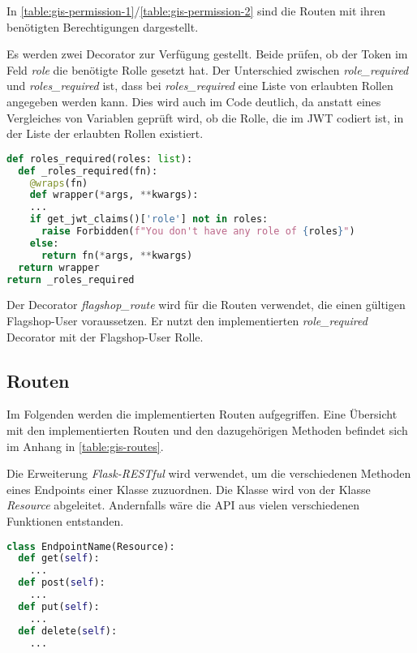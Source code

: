 In \autoref{table:gis-permission-1}/\ref{table:gis-permission-2} sind die Routen mit ihren benötigten Berechtigungen dargestellt.

Es werden zwei Decorator zur Verfügung gestellt. Beide prüfen, ob der Token im Feld \textit{role} die benötigte Rolle gesetzt hat. Der Unterschied zwischen \textit{role\_required} und \textit{roles\_required} ist, dass bei \textit{roles\_required} eine Liste von erlaubten Rollen angegeben werden kann. Dies wird auch im Code deutlich, da anstatt eines Vergleiches von Variablen geprüft wird, ob die Rolle, die im JWT codiert ist, in der Liste der erlaubten Rollen existiert.

\begin{lstlisting}[language=Python, frame=single, caption={GIS Prüfung der Rollen}, captionpos=b, label={lst:gis-permission-wrapper}]
def roles_required(roles: list):
  def _roles_required(fn):
    @wraps(fn)
    def wrapper(*args, **kwargs):
    ...
    if get_jwt_claims()['role'] not in roles:
      raise Forbidden(f"You don't have any role of {roles}")
    else:
      return fn(*args, **kwargs)
  return wrapper
return _roles_required
\end{lstlisting}

Der Decorator \textit{flagshop\_route} wird für die Routen verwendet, die einen gültigen Flagshop-User voraussetzen. Er nutzt den implementierten \textit{role\_required} Decorator mit der Flagshop-User Rolle.

\subsection{Routen} \label{sub:realisierung-gis-routen}
Im Folgenden werden die implementierten Routen aufgegriffen. Eine Übersicht mit den implementierten Routen und den dazugehörigen Methoden befindet sich im Anhang in \autoref{table:gis-routes}.

Die Erweiterung \textit{Flask-RESTful} wird verwendet, um die verschiedenen Methoden eines Endpoints einer Klasse zuzuordnen. Die Klasse wird von der Klasse \textit{Resource} abgeleitet. Andernfalls wäre die API aus vielen verschiedenen Funktionen entstanden.

\begin{lstlisting}[language=Python, frame=single, caption={GIS Beispiel eines Endpoints}, captionpos=b, label={lst:gis-endpoint}]
class EndpointName(Resource):
  def get(self):
    ...
  def post(self):
    ...
  def put(self):
    ...
  def delete(self):
    ...
\end{lstlisting}

